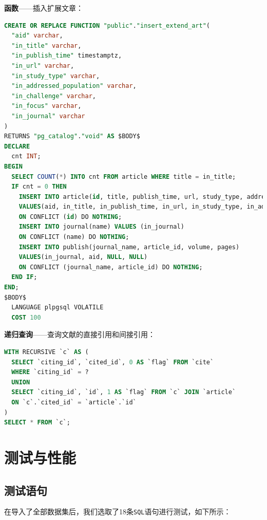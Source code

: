 \documentclass[UTF8,openany]{ctexbook}
\begin{document}
\textbf{函数}——插入扩展文章：

\begin{lstlisting}[language=sql]
CREATE OR REPLACE FUNCTION "public"."insert_extend_art"(
  "aid" varchar, 
  "in_title" varchar, 
  "in_publish_time" timestamptz, 
  "in_url" varchar, 
  "in_study_type" varchar, 
  "in_addressed_population" varchar, 
  "in_challenge" varchar, 
  "in_focus" varchar, 
  "in_journal" varchar
)
RETURNS "pg_catalog"."void" AS $BODY$
DECLARE
  cnt INT;
BEGIN
  SELECT COUNT(*) INTO cnt FROM article WHERE title = in_title;
  IF cnt = 0 THEN
    INSERT INTO article(id, title, publish_time, url, study_type, addressed_population, challenge, focus)
    VALUES(aid, in_title, in_publish_time, in_url, in_study_type, in_addressed_population, in_challenge, in_focus)
    ON CONFLICT (id) DO NOTHING;
    INSERT INTO journal(name) VALUES (in_journal)
    ON CONFLICT (name) DO NOTHING;
    INSERT INTO publish(journal_name, article_id, volume, pages)
    VALUES(in_journal, aid, NULL, NULL)
    ON CONFLICT (journal_name, article_id) DO NOTHING;
  END IF;
END;
$BODY$
  LANGUAGE plpgsql VOLATILE
  COST 100
\end{lstlisting}

\textbf{递归查询}——查询文献的直接引用和间接引用：

\begin{lstlisting}[language=sql]
WITH RECURSIVE `c` AS (
  SELECT `citing_id`, `cited_id`, 0 AS `flag` FROM `cite`
  WHERE `citing_id` = ?
  UNION
  SELECT `citing_id`, `id`, 1 AS `flag` FROM `c` JOIN `article`
  ON `c`.`cited_id` = `article`.`id`
) 
SELECT * FROM `c`;
\end{lstlisting}

\chapter{测试与性能}
\label{sec:performance}

\section{测试语句}

在导入了全部数据集后，我们选取了18条\texttt{SQL}语句进行测试，如下所示：
\end{document}
